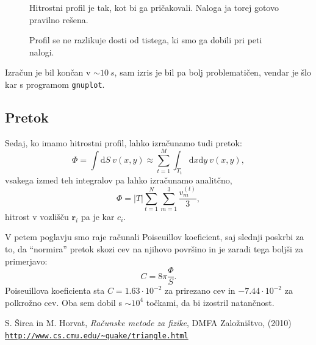 \documentclass[a4 paper, 12pt]{article}
\renewcommand{\d}{
	\ensuremath{\mathrm{d}}
}
\begin{document}
\begin{figure}[H]\centering
	
	\vspace{-32pt}
	\caption{Hitrostni profil je tak, kot bi ga pri\v cakovali. Naloga ja torej gotovo
		pravilno re\v sena.}
	\label{gr2}
\end{figure}\vspace{-45pt}

\begin{figure}[H]\centering
	
	\vspace{-20pt}
	\caption{Profil se ne razlikuje dosti od tistega, ki smo ga dobili pri peti nalogi.}
	\label{gr3}
\end{figure}
Izra\v cun je bil kon\v can v $\sim 10\ s$, sam izris je bil pa bolj problemati\v cen, vendar
je \v slo kar s programom {\tt gnuplot}.

\subsection{Pretok}
Sedaj, ko imamo hitrostni profil, lahko izra\v cunamo tudi pretok:
\[
	\Phi = \int \d S\ v (x,y) \approx \sum_{t = 1}^M \int_{T_t} \d x\d y\ v(x,y),
\]
vsakega izmed teh integralov pa lahko izra\v cunamo analit\v cno,
\[
	\Phi = |T|\sum_{t = 1}^N \sum_{m = 1}^3 \frac{v_m^{(t)}}{3},
\]
hitrost v vozli\v s\v cu $\mathbf{r}_i$ pa je kar $c_i$.

V petem poglavju smo raje ra\v cunali Poiseuillov koeficient, saj slednji poskrbi za to, da "`normira"'
pretok skozi cev na njihovo povr\v sino in je zaradi tega bolj\v si za primerjavo:
\[
	C = 8\pi\frac{\Phi}{S}.
\]
Poiseuillova koeficienta sta $C = 1.63 \cdot 10^{-2}$ za prirezano cev in $-7.44 \cdot 10^{-2}$ za
polkro\v zno cev. Oba sem dobil s $\sim 10^4$ to\v ckami, da bi izostril natan\v cnost.

\begin{thebibliography}{9}
		S. \v Sirca in M. Horvat,
		{\em Ra\v cunske metode za fizike},
		DMFA Zalo\v zni\v stvo,
		(2010)
		{\tt \url{http://www.cs.cmu.edu/\~quake/triangle.html}}
\end{thebibliography}
\end{document}
